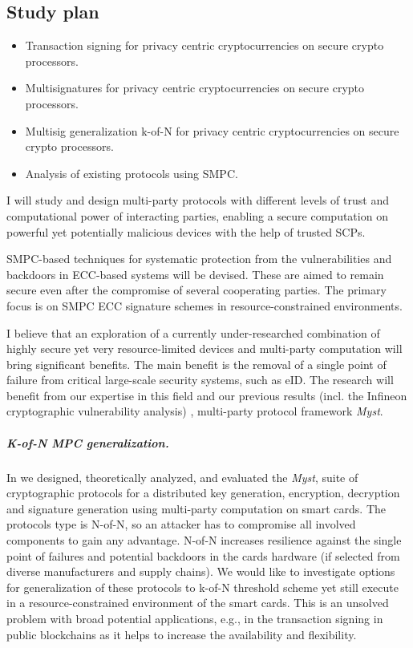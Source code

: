 \documentclass[
  digital, %
  twoside, %
  table,   %
  lof,     %
  lot,     %
]{fithesis3}
\theoremstyle{definition}
\theoremstyle{remark}
\begin{document}
\begin{ecmmnt}  %
\chapter{Study plan}
\begin{itemize}
	\item Transaction signing for privacy centric cryptocurrencies on secure crypto processors.  
    \item Multisignatures for privacy centric cryptocurrencies on secure crypto processors. 
    \item Multisig generalization k-of-N for privacy centric cryptocurrencies on secure crypto processors. 
    \item Analysis of existing protocols using SMPC. 
\end{itemize}

I will study and design multi-party protocols with different levels of trust and computational power of interacting parties, enabling a secure computation on powerful yet potentially malicious devices with the help of trusted SCPs.

SMPC-based techniques for systematic protection from the vulnerabilities and backdoors in ECC-based systems will be devised. These are aimed to remain secure even after the compromise of several cooperating parties. The primary focus is on SMPC ECC signature schemes in resource-constrained environments.

I believe that an exploration of a currently under-researched combination of highly secure yet very resource-limited devices and multi-party computation will bring significant benefits. The main benefit is the removal of a single point of failure from critical large-scale security systems, such as eID. The research will benefit from our expertise in this field and our previous results (incl. the Infineon cryptographic vulnerability analysis) \cite{2017-ccs-mavroudis, 2017-ccs-nemec}, multi-party protocol framework \emph{Myst}.

\paragraph{K-of-N MPC generalization.} In \cite{2017-ccs-mavroudis} we designed, theoretically analyzed, and evaluated the \emph{Myst}, suite of cryptographic protocols for a distributed key generation, encryption, decryption and signature generation using multi-party computation on smart cards. The protocols type is N-of-N, so an attacker has to compromise all involved components to gain any advantage. N-of-N increases resilience against the single point of failures and potential backdoors in the cards hardware (if selected from diverse manufacturers and supply chains). We would like to investigate options for generalization of these protocols to k-of-N threshold scheme yet still execute in a resource-constrained environment of the smart cards. This is an unsolved problem with broad potential applications, e.g., in the transaction signing in public blockchains as it helps to increase the availability and flexibility.  



\end{ecmmnt}
\end{document}
